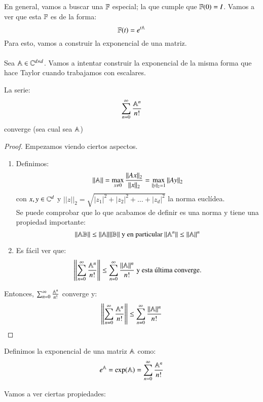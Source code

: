 En general, vamos a buscar una $\mathbb{F}$ especial; la que cumple que $\mathbb{F}(0) = I$. Vamos a ver que esta $\mathbb{F}$ es de la forma:
$$
    \mathbb{F}(t) = e^{t\mathbb{A}}
$$
Para esto, vamos a construir la exponencial de una matriz.\\\\
Sea $\mathbb{A} \in \mathbb{C}^{d\times d}$. Vamos a intentar construir la exponencial de la misma forma que hace Taylor cuando trabajamos con escalares.
\begin{pro}
    La serie:
    $$
        \sum_{n=0}^\infty \frac{\mathbb{A}^n}{n!}
    $$
    converge (sea cual sea $\mathbb{A}$)
\end{pro}
\begin{proof}
    Empezamos viendo ciertos aspectos.\\
    \begin{enumerate}
        \item Definimos:
            $$
            ||\mathbb{A}|| = \max_{x\neq0} \frac{||Ax||_2}{||x||_2} = \max_{||y||_2=1}||Ay||_2
            $$
            con $x, y \in \mathbb{C}^d$ y $||z||_2 = \sqrt{|z_1|^2+|z_2|^2+\ldots+|z_d|^2}$ la norma euclídea.\\
            Se puede comprobar que lo que acabamos de definir es una norma y tiene una propiedad importante:
            $$
                ||\mathbb{A} \mathbb{B}|| \leq ||\mathbb{A}||||\mathbb{B}|| \text{ y en particular } ||\mathbb{A}^n|| \leq ||\mathbb{A}||^n
            $$
        \item Es fácil ver que:
            $$
                \left|\left|\sum_{n=0}^{\infty} \frac{\mathbb{A}^n}{n!}\right|\right| \leq \sum_{n=0}^{\infty} \frac{||\mathbb{A}||^n}{n!} \text{ y esta última converge.}
            $$
    \end{enumerate}
    Entonces, $\sum_{n=0}^{\infty} \frac{\mathbb{A}^n}{n!}$ converge y:
    $$
        \left|\left|\sum_{n=0}^{\infty} \frac{\mathbb{A}^n}{n!}\right|\right| \leq \sum_{n=0}^{\infty} \frac{||\mathbb{A}||^n}{n!}
    $$
\end{proof}
\begin{dfn}
    Definimos la exponencial de una matriz $\mathbb{A}$ como:
    $$
        e^{\mathbb{A}} = \exp(\mathbb{A}) = \sum_{n=0}^{\infty} \frac{\mathbb{A}^n}{n!}
    $$
\end{dfn}
Vamos a ver ciertas propiedades:\\
